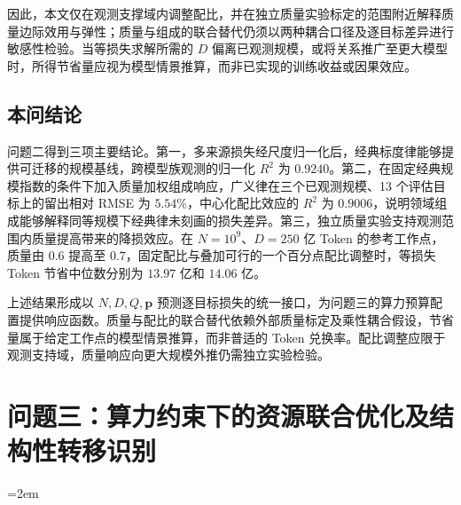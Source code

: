 \documentclass[bwprint]{gmcmthesis}
\begin{document}
因此，本文仅在观测支撑域内调整配比，并在独立质量实验标定的范围附近解释质量边际效用与弹性；质量与组成的联合替代仍须以两种耦合口径及逐目标差异进行敏感性检验。当等损失求解所需的 $D$ 偏离已观测规模，或将关系推广至更大模型时，所得节省量应视为模型情景推算，而非已实现的训练收益或因果效应。

\subsection{本问结论}

问题二得到三项主要结论。第一，多来源损失经尺度归一化后，经典标度律能够提供可迁移的规模基线，跨模型族观测的归一化 $R^2$ 为 $0.9240$。第二，在固定经典规模指数的条件下加入质量加权组成响应，广义律在三个已观测规模、13 个评估目标上的留出相对 RMSE 为 $5.54\%$，中心化配比效应的 $R^2$ 为 $0.9006$，说明领域组成能够解释同等规模下经典律未刻画的损失差异。第三，独立质量实验支持观测范围内质量提高带来的降损效应。在 $N=10^9$、$D=250$ 亿 Token 的参考工作点，质量由 $0.6$ 提高至 $0.7$，固定配比与叠加可行的一个百分点配比调整时，等损失 Token 节省中位数分别为 $13.97$ 亿和 $14.06$ 亿。

上述结果形成以 $N,D,Q,\mathbf p$ 预测逐目标损失的统一接口，为问题三的算力预算配置提供响应函数。质量与配比的联合替代依赖外部质量标定及乘性耦合假设，节省量属于给定工作点的模型情景推算，而非普适的 Token 兑换率。配比调整应限于观测支持域，质量响应向更大规模外推仍需独立实验检验。


\section{问题三：算力约束下的资源联合优化及结构性转移识别}
\begingroup
\normalsize
\emergencystretch=2em
\setlength{\parskip}{0pt}
\setlength{\textfloatsep}{4pt plus 1pt minus 1pt}
\setlength{\floatsep}{3pt plus 1pt minus 1pt}
\setlength{\intextsep}{4pt plus 1pt minus 1pt}
\setlength{\abovedisplayskip}{5pt}
\setlength{\belowdisplayskip}{5pt}
\setlength{\abovetopsep}{4pt}
\setlength{\belowcaptionskip}{2pt}
\captionsetup[subfigure]{font=small,skip=3pt}
\renewcommand{\tabularxcolumn}[1]{m{#1}}
\end{document}
